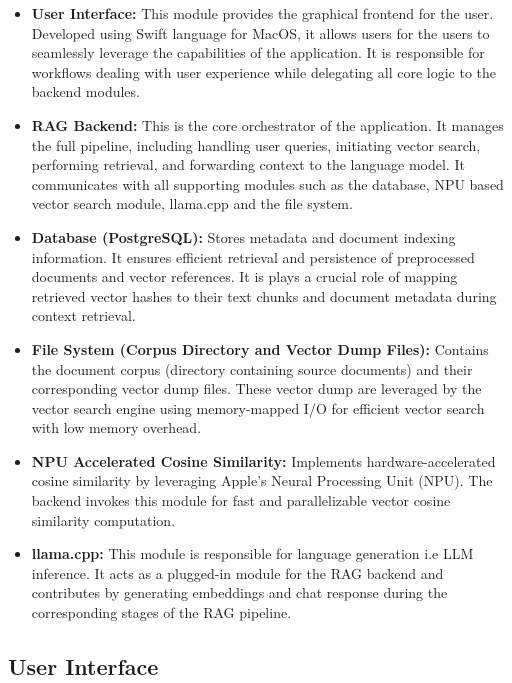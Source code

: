 \begin{itemize}
    \item \textbf{User Interface:} This module provides the graphical frontend for the user. Developed using Swift language for MacOS, it allows users for the users to seamlessly leverage the capabilities of the application. It is responsible for workflows dealing with user experience while delegating all core logic to the backend modules.

    \item \textbf{RAG Backend:} This is the core orchestrator of the application. It manages the full pipeline, including handling user queries, initiating vector search, performing retrieval, and forwarding context to the language model. It communicates with all supporting modules such as the database, NPU based vector search module, llama.cpp and the file system.

    \item \textbf{Database (PostgreSQL):} Stores metadata and document indexing information. It ensures efficient retrieval and persistence of preprocessed documents and vector references. It is plays a crucial role of mapping retrieved vector hashes to their text chunks and document metadata during context retrieval.

    \item \textbf{File System (Corpus Directory and Vector Dump Files):} Contains the document corpus (directory containing source documents) and their corresponding vector dump files. These vector dump are leveraged by the vector search engine using memory-mapped I/O for efficient vector search with low memory overhead.

    \item \textbf{NPU Accelerated Cosine Similarity:} Implements hardware-accelerated cosine similarity by leveraging Apple's Neural Processing Unit (NPU). The backend invokes this module for fast and parallelizable vector cosine similarity computation.

    \item \textbf{llama.cpp:} This module is responsible for language generation i.e LLM inference. It acts as a plugged-in module for the RAG backend and contributes by generating embeddings and chat response during the corresponding stages of the RAG pipeline.
\end{itemize}


\subsection{User Interface}
\label{subsec:AppDesignModules-UI}

